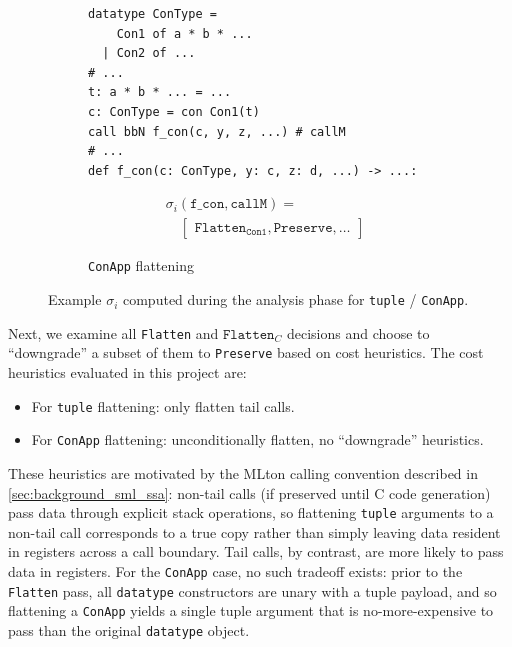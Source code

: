 \begin{figure}[htbp]
  \begin{subfigure}{\textwidth}
    \caption{\texttt{ConApp} flattening}
    \label{fig:example_sigma_init_con}
    \vspace{1mm}
    \begin{minipage}[c]{0.52\textwidth}
\begin{verbatim}
datatype ConType =
    Con1 of a * b * ...
  | Con2 of ...
# ...
t: a * b * ... = ...
c: ConType = con Con1(t)
call bbN f_con(c, y, z, ...) # callM
# ...
def f_con(c: ConType, y: c, z: d, ...) -> ...:
\end{verbatim}
    \end{minipage}\hfill
    \begin{minipage}[c]{0.45\textwidth}
      \[
      \begin{aligned}
        & \sigma_i(\texttt{f\_con}, \texttt{callM}) = \\
        & \quad \begin{bmatrix}
          \texttt{Flatten}_{\texttt{Con1}}, \texttt{Preserve}, \dots
        \end{bmatrix}
      \end{aligned}
      \]
    \end{minipage}
  \end{subfigure}
  \caption{Example $\sigma_i$ computed during the analysis phase for \texttt{tuple} / \texttt{ConApp}. }
  \label{fig:example_sigma_init}
\end{figure}

Next, we examine all \texttt{Flatten} and $\texttt{Flatten}_C$ decisions and
choose to ``downgrade'' a subset of them to \texttt{Preserve} based on cost
heuristics. The cost heuristics evaluated in this project are:

\begin{itemize}
\item For \texttt{tuple} flattening: only flatten tail calls.

\item For \texttt{ConApp} flattening: unconditionally flatten, no ``downgrade'' heuristics.
\end{itemize}

These heuristics are motivated by the MLton calling convention described
in \cref{sec:background_sml_ssa}: non-tail calls (if preserved until C code
generation) pass data through explicit stack operations, so
flattening \texttt{tuple} arguments to a non-tail call corresponds to a true
copy rather than simply leaving data resident in registers across a call
boundary. Tail calls, by contrast, are more likely to pass data in registers.
For the \texttt{ConApp} case, no such tradeoff exists: prior to
the \texttt{Flatten} pass, all \texttt{datatype} constructors are unary with a
tuple payload, and so flattening a \texttt{ConApp} yields a single tuple
argument that is no-more-expensive to pass than the original \texttt{datatype}
object.

